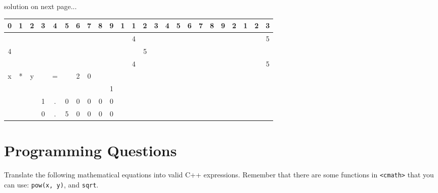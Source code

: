 \documentclass[11pt,answers]{exam}
\begin{document}
\begin{questions}
\begin{solution}
  solution on next page...
  \newpage

  \begin{tabular}{|c|c|c|c|c|c|c|c|c|c|c|c|c|c|c|c|c|c|c|c|c|c|c|c|}  
  \hline
0 & 1 & 2 & 3 & 4 & 5 & 6 & 7 & 8 & 9 & 1 & 1 & 2 & 3 & 4 & 5 & 6 & 7 & 8 & 9 & 2 & 1 & 2 & 3 \\
\hline
  &   &   &   &   &   &   &   &   &   &   & 4 &   &   &   &   &   &   &   &   &   &   &   & 5 \\
\hline
4  &   &   &   &   &   &   &   &   &   &   &   &5  &   &   &   &   &   &   &   &   &   &   &  \\
\hline
  &   &   &   &   &   &   &   &   &   &   & 4 &   &   &   &   &   &   &   &   &   &   &   & 5 \\
\hline
x  &*  &y  &   &=  &   &2  &0  &   &   &   &   &   &   &   &   &   &   &   &   &   &   &   &  \\
\hline
  &   &   &   &   &   &   &   &   & 1 &   &   &   &   &   &   &   &   &   &   &   &   &   &   \\
\hline
  &   &   & 1 & . & 0 & 0 & 0 & 0 & 0 &   &   &   &   &   &   &   &   &   &   &   &   &   &   \\
\hline
  &   &   & 0 & . & 5 & 0 & 0 & 0 & 0 &   &   &   &   &   &   &   &   &   &   &   &   &   &   \\
\hline
  \end{tabular}
  
\end{solution}

\newpage
\section*{Programming Questions}

\question Translate the following mathematical equations into valid C++ expressions. Remember that there are some functions in {\tt <cmath>} that you can use: {\tt pow(x, y)}, and {\tt sqrt}.

\end{questions}
\end{document}
